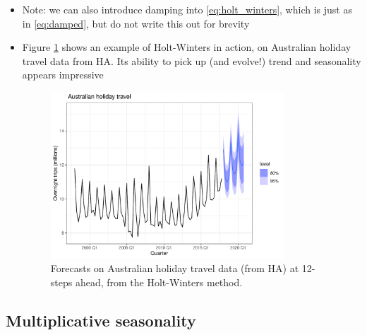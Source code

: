\documentclass{article}
\begin{document}
\begin{itemize}
\item Note: we can also introduce damping into \eqref{eq:holt_winters}, which
  is just as in \eqref{eq:damped}, but do not write this out for brevity

\item Figure \ref{fig:holiday} shows an example of Holt-Winters in action, on 
  Australian holiday travel data from HA. Its ability to pick up (and evolve!)
  trend and seasonality appears impressive

\begin{figure}[htb]
\centering
\includegraphics[width=0.825\textwidth]{fig/holiday-1.pdf}
\caption{Forecasts on Australian holiday travel data (from HA) at 12-steps
  ahead, from the Holt-Winters method.} 
\label{fig:holiday}
\end{figure}
\end{itemize}

\subsection{Multiplicative seasonality}
\end{document}
